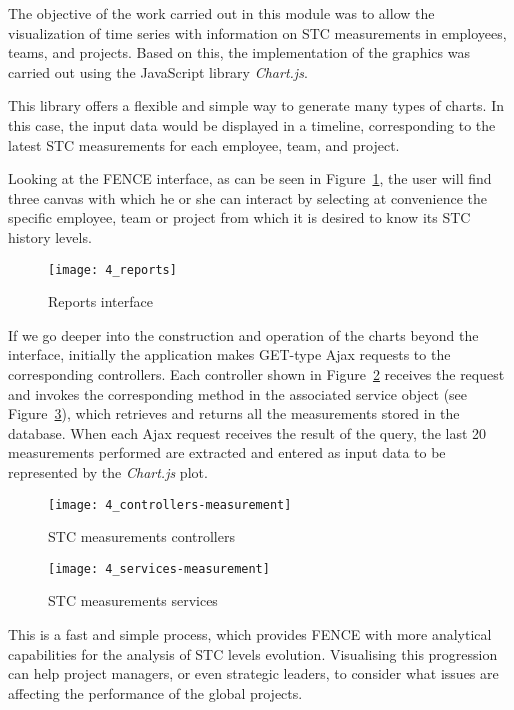 The objective of the work carried out in this module was to allow the visualization of time series with information on STC measurements in employees, teams, and projects. Based on this, the implementation of the graphics was carried out using the JavaScript library \emph{Chart.js}.

This library offers a flexible and simple way to generate many types of charts. In this case, the input data would be displayed in a timeline, corresponding to the latest STC measurements for each employee, team, and project.

Looking at the FENCE interface, as can be seen in Figure~\ref{fig:reports}, the user will find three canvas with which he or she can interact by selecting at convenience the specific employee, team or project from which it is desired to know its STC history levels.

\begin{figure}
	\centering
	\texttt{[image: 4\_reports]}
	\caption[Reports interface]{Reports interface}
	\label{fig:reports}
\end{figure}

If we go deeper into the construction and operation of the charts beyond the interface, initially the application makes GET-type Ajax requests to the corresponding controllers. Each controller shown in Figure~\ref{fig:measurements-controllers} receives the request and invokes the corresponding method in the associated service object (see Figure~\ref{fig:measurements-services}), which retrieves and returns all the measurements stored in the database. When each Ajax request receives the result of the query, the last 20 measurements performed are extracted and entered as input data to be represented by the \emph{Chart.js} plot.

\begin{figure}
	\centering
	\texttt{[image: 4\_controllers-measurement]}
	\caption[STC measurements controllers]{STC measurements controllers}
	\label{fig:measurements-controllers}
\end{figure}

\begin{figure}
	\centering
	\texttt{[image: 4\_services-measurement]}
	\caption[STC measurements services]{STC measurements services}
	\label{fig:measurements-services}
\end{figure}

This is a fast and simple process, which provides FENCE with more analytical capabilities for the analysis of STC levels evolution. Visualising this progression can help project managers, or even strategic leaders, to consider what issues are affecting the performance of the global projects. 

